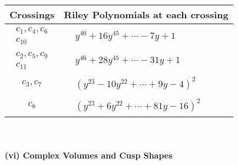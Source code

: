 \documentclass[1p]{elsarticle_modified}
\theoremstyle{definition}
\begin{document}
\begin{tabular}{m{50pt}|m{274pt}}
Crossings & \hspace{64pt}Riley Polynomials at each crossing \\
\hline $$\begin{aligned}c_{1},c_{4},c_{6}\\c_{10}\end{aligned}$$&$\begin{aligned}
&y^{46}+16 y^{45}+\cdots-7 y+1
\end{aligned}$\\
\hline $$\begin{aligned}c_{2},c_{5},c_{9}\\c_{11}\end{aligned}$$&$\begin{aligned}
&y^{46}+28 y^{45}+\cdots-31 y+1
\end{aligned}$\\
\hline $$\begin{aligned}c_{3},c_{7}\end{aligned}$$&$\begin{aligned}
&(y^{23}-10 y^{22}+\cdots+9 y-4)^{2}
\end{aligned}$\\
\hline $$\begin{aligned}c_{8}\end{aligned}$$&$\begin{aligned}
&(y^{23}+6 y^{22}+\cdots+81 y-16)^{2}
\end{aligned}$\\
\hline
\end{tabular}\\~\\
\newpage\flushleft \textbf{(vi) Complex Volumes and Cusp Shapes}
\end{document}
